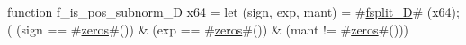 function f_is_pos_subnorm_D   x64 = {
  let (sign, exp, mant) = #\hyperref[sailRISCVzfsplitzyD]{fsplit\_D}# (x64);
  (  (sign == #\hyperref[sailRISCVzzzeros]{zeros}#())
   & (exp  == #\hyperref[sailRISCVzzzeros]{zeros}#())
   & (mant != #\hyperref[sailRISCVzzzeros]{zeros}#()))
}

